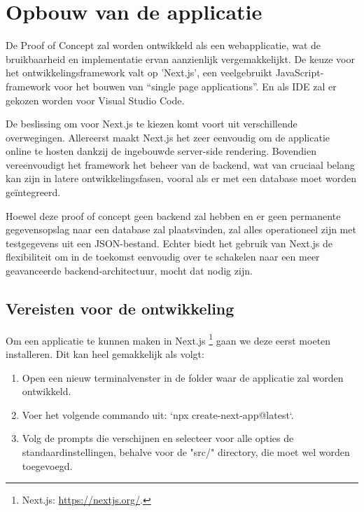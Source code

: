 \section{Opbouw van de applicatie}

De Proof of Concept zal worden ontwikkeld als een webapplicatie, wat de bruikbaarheid en implementatie ervan aanzienlijk vergemakkelijkt. De keuze voor het ontwikkelingsframework valt op 'Next.js', een veelgebruikt JavaScript-framework voor het bouwen van “single page applications”. En als IDE zal er gekozen worden voor Visual Studio Code. \newline

De beslissing om voor Next.js te kiezen komt voort uit verschillende overwegingen. Allereerst maakt Next.js het zeer eenvoudig om de applicatie online te hosten dankzij de ingebouwde server-side rendering. Bovendien vereenvoudigt het framework het beheer van de backend, wat van cruciaal belang kan zijn in latere ontwikkelingsfasen, vooral als er met een database moet worden geïntegreerd.  \newline

Hoewel deze proof of concept geen backend zal hebben en er geen permanente gegevensopslag naar een database zal plaatsvinden, zal alles operationeel zijn met testgegevens uit een JSON-bestand. Echter biedt het gebruik van Next.js de flexibiliteit om in de toekomst eenvoudig over te schakelen naar een meer geavanceerde backend-architectuur, mocht dat nodig zijn.

\subsection{Vereisten voor de ontwikkeling}

Om een applicatie te kunnen maken in Next.js \footnote{Next.js: \url{https://nextjs.org/}.} gaan we deze eerst moeten installeren. Dit kan heel gemakkelijk als volgt:

\begin{enumerate}
    \item	Open een nieuw terminalvenster in de folder waar de applicatie zal worden ontwikkeld.
    \item	Voer het volgende commando uit: `npx create-next-app@latest`.
    \item	Volg de prompts die verschijnen en selecteer voor alle opties de standaardinstellingen, behalve voor de "src/" directory, die moet wel worden toegevoegd.
\end{enumerate}

